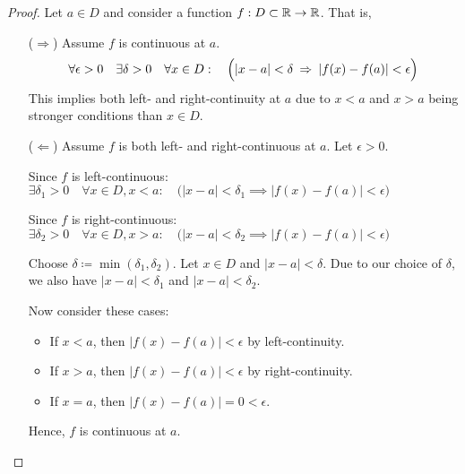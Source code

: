 \begin{proof}
    Let $a \in D$ and consider a function $f : D \subset \R \to \R$. That is,

    \begin{itemize}
    \item[($\Rightarrow$)] Assume $f$ is continuous at $a$.
        \begin{align*}
            \forall \epsilon > 0 \quad \exists \delta > 0
            \quad \forall x \in D: \quad
            \Bigl(|x - a| < \delta \: \implies \: |f(x) - f(a)| < \epsilon \Bigr)
        \end{align*}
        This implies both left- and right-continuity at $a$ due to $x < a$ and $x > a$ being stronger conditions than $x \in D$.

    \item[($\Leftarrow$)] Assume $f$ is both left- and right-continuous at $a$. Let $\epsilon > 0$.
    
        Since $f$ is left-continuous: $\exists \delta_1 > 0 \quad
        \forall x \in D, x < a: \quad
        \bigl(|x - a| < \delta_1 \implies |f(x) - f(a)| < \epsilon\bigr)$

        Since $f$ is right-continuous: $\exists \delta_2 > 0 \quad
        \forall x \in D, x > a: \quad
        \bigl(|x - a| < \delta_2 \implies |f(x) - f(a)| < \epsilon\bigr)$

        Choose $\delta \coloneqq \min(\delta_1, \delta_2)$. Let $x \in D$ and $|x - a| < \delta$. Due to our choice of $\delta$, we also have $|x-a| < \delta_1$ and $|x-a| < \delta_2$.
        
        Now consider these cases:

        \begin{itemize}
            \item If $x < a$, then $|f(x) - f(a)| < \epsilon$ by left-continuity.
            \item If $x > a$, then $|f(x) - f(a)| < \epsilon$ by right-continuity.
            \item If $x = a$, then $|f(x) - f(a)| = 0 < \epsilon$.
        \end{itemize}

        Hence, $f$ is continuous at $a$.
    \end{itemize}
\end{proof}
